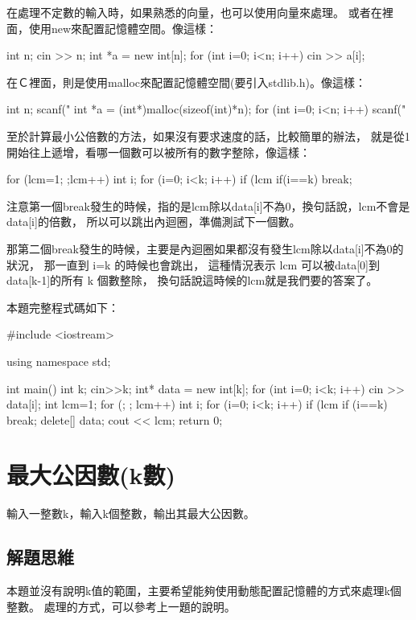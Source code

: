 在處理不定數的輸入時，如果熟悉\cc{}的向量，也可以使用向量來處理。
或者在\cc{}裡面，使用new來配置記憶體空間。像這樣：
\begin{inside}
	int n;  cin >> n;
	int *a = new int[n];
	for (int i=0; i<n; i++) cin >> a[i];
\end{inside}	

在Ｃ裡面，則是使用malloc來配置記憶體空間(要引入stdlib.h)。像這樣：
\begin{inside}
	int n;  scanf("%
	int *a = (int*)malloc(sizeof(int)*n);
	for (int i=0; i<n; i++) scanf("%
\end{inside}	

至於計算最小公倍數的方法，如果沒有要求速度的話，比較簡單的辦法，
就是從1開始往上遞增，看哪一個數可以被所有的數字整除，像這樣：
\begin{inside}
	for (lcm=1; ;lcm++) {
		int i;
		for (i=0; i<k; i++) {
			if (lcm%
		}
		if(i==k) break;
	}
\end{inside}
注意第一個break發生的時候，指的是lcm除以data[i]不為0，換句話說，lcm不會是data[i]的倍數，
所以可以跳出內迴圈，準備測試下一個數。

那第二個break發生的時候，主要是內迴圈如果都沒有發生lcm除以data[i]不為0的狀況，
那一直到 i=k 的時候也會跳出，
這種情況表示 lcm 可以被data[0]到data[k-1]的所有 k 個數整除，
換句話說這時候的lcm就是我們要的答案了。

本題完整程式碼如下：	
\begin{cppcode}
#include <iostream>

using namespace std;

int main()
{
	int k; cin>>k;
	int* data = new int[k];
	for (int i=0; i<k; i++) cin >> data[i];
	int lcm=1;
	for (; ; lcm++) {
		int i;
		for (i=0; i<k; i++) {
			if (lcm%
		}
		if (i==k) break;
	}
	delete[] data;
	cout << lcm;
	return 0;
}
\end{cppcode}


\section{最大公因數(k數)}
輸入一整數k，輸入k個整數，輸出其最大公因數。

\subsection{解題思維}
本題並沒有說明k值的範圍，主要希望能夠使用動態配置記憶體的方式來處理k個整數。
處理的方式，可以參考上一題的說明。

